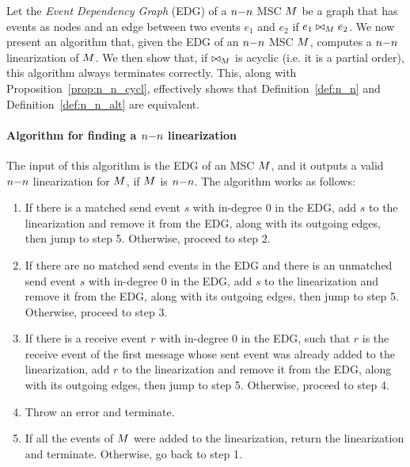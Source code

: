 \documentclass{article}
\begin{document}
Let the \emph{Event Dependency Graph} (EDG) of a $n\mathsf{-}n$ MSC $M$ be a graph that has events as nodes and an edge between two events $e_1$ and $e_2$ if $e_1 \bowtie_M e_2$. We now present an algorithm that, given the EDG of an $n\mathsf{-}n$ MSC $M$, computes a $n\mathsf{-}n$ linearization of $M$. We then show that, if $\bowtie_M$ is acyclic (i.e. it is a partial order), this algorithm always terminates correctly. This, along with Proposition~\ref{prop:n_n_cycl}, effectively shows that Definition~\ref{def:n_n} and Definition~\ref{def:n_n_alt} are equivalent.

\paragraph*{Algorithm for finding a $n\mathsf{-}n$ linearization}
The input of this algorithm is the EDG of an MSC $M$, and it outputs a valid $n\mathsf{-}n$ linearization for $M$, if $M$ is $n\mathsf{-}n$. The algorithm works as follows:
\begin{enumerate}
	\item If there is a matched send event $s$ with in-degree 0 in the EDG, add $s$ to the linearization and remove it from the EDG, along with its outgoing edges, then jump to step 5. Otherwise, proceed to step 2.
	\item If there are no matched send events in the EDG and there is an unmatched send event $s$ with in-degree 0 in the EDG, add $s$ to the linearization and remove it from the EDG, along with its outgoing edges, then jump to step 5. Otherwise, proceed to step 3.
 	\item If there is a receive event $r$ with in-degree 0 in the EDG, such that $r$ is the receive event of the first message whose sent event was already added to the linearization, add $r$ to the linearization and remove it from the EDG, along with its outgoing edges, then jump to step 5. Otherwise, proceed to step 4.
   	\item Throw an error and terminate.
   	\item If all the events of $M$ were added to the linearization, return the linearization and terminate. Otherwise, go back to step 1.
\end{enumerate} 
\end{document}
